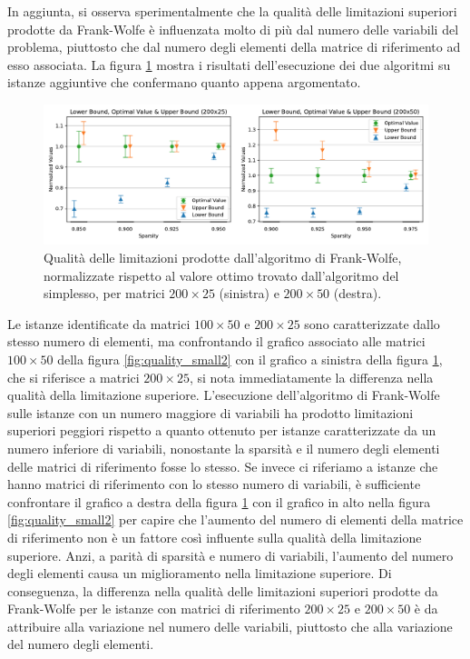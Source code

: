 \noindent
In aggiunta, si osserva sperimentalmente che la qualità delle limitazioni superiori prodotte da Frank-Wolfe è
influenzata molto di più dal numero delle variabili del problema, piuttosto che dal numero degli elementi della matrice
di riferimento ad esso associata. La figura \ref{fig:quality_small_extra} mostra i risultati dell'esecuzione dei due
algoritmi su istanze aggiuntive che confermano quanto appena argomentato.
\begin{figure}[ht]
    \centering
    \includegraphics[width=\textwidth]{assets/figures/Extra.pdf}
    \caption{Qualità delle limitazioni prodotte dall'algoritmo di Frank-Wolfe, normalizzate rispetto al valore ottimo
    trovato dall'algoritmo del simplesso, per matrici \( 200\times 25 \) (sinistra) e \( 200\times50 \) (destra).}
    \label{fig:quality_small_extra}
\end{figure}

\noindent
Le istanze identificate da matrici \( 100\times 50 \) e \( 200\times 25 \) sono caratterizzate dallo stesso numero di
elementi, ma confrontando il grafico associato alle matrici \( 100\times 50 \) della figura \ref{fig:quality_small2} con
il grafico a sinistra della figura \ref{fig:quality_small_extra}, che si riferisce a matrici \( 200\times 25 \), si nota
immediatamente la differenza nella qualità della limitazione superiore. L'esecuzione dell'algoritmo di Frank-Wolfe sulle
istanze con un numero maggiore di variabili ha prodotto limitazioni superiori peggiori rispetto a quanto ottenuto per
istanze caratterizzate da un numero inferiore di variabili, nonostante la sparsità e il numero degli elementi delle
matrici di riferimento fosse lo stesso. Se invece ci riferiamo a istanze che hanno matrici di riferimento con lo stesso
numero di variabili, è sufficiente confrontare il grafico a destra della figura \ref{fig:quality_small_extra} con il
grafico in alto nella figura \ref{fig:quality_small2} per capire che l'aumento del numero di elementi della matrice di
riferimento non è un fattore così influente sulla qualità della limitazione superiore. Anzi, a parità di sparsità e
numero di variabili, l'aumento del numero degli elementi causa un miglioramento nella limitazione superiore. Di
conseguenza, la differenza nella qualità delle limitazioni superiori prodotte da Frank-Wolfe per le istanze con matrici
di riferimento \( 200\times 25 \) e  \( 200\times 50 \) è da attribuire alla variazione nel numero delle variabili,
piuttosto che alla variazione del numero degli elementi.




